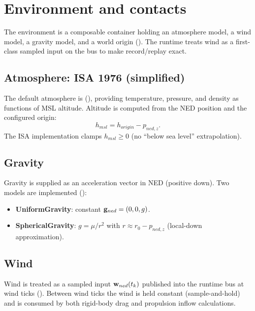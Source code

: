 \section{Environment and contacts}
\label{sec:environment}

The environment is a composable container  holding an atmosphere model, a wind model, a gravity model, and a world origin (). The runtime treats wind as a first-class sampled input on the bus to make record/replay exact.

\subsection{Atmosphere: ISA 1976 (simplified)}

The default atmosphere is  (), providing temperature, pressure, and density as functions of MSL altitude. Altitude is computed from the NED position and the configured origin:
\begin{equation}
  h_{msl} = h_{origin} - p_{ned,z}.
\end{equation}
The ISA implementation clamps $h_{msl}\ge 0$ (no ``below sea level'' extrapolation).

\subsection{Gravity}

Gravity is supplied as an acceleration vector in NED (positive down). Two models are implemented ():
\begin{itemize}[leftmargin=*,itemsep=2pt]
  \item \textbf{UniformGravity}: constant \(\mathbf{g}_{ned}=(0,0,g)\).
  \item \textbf{SphericalGravity}: \(g = \mu/r^2\) with \(r\approx r_0 - p_{ned,z}\) (local-down approximation).
\end{itemize}

\subsection{Wind}
\label{sec:wind}

Wind is treated as a sampled input \(\mathbf{w}_{ned}(t_k)\) published into the runtime bus at wind ticks (). Between wind ticks the wind is held constant (sample-and-hold) and is consumed by both rigid-body drag and propulsion inflow calculations.

